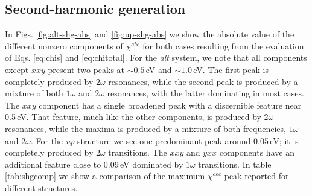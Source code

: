 \documentclass[pss]{wiley2sp} %
\begin{document}
\subsection{Second-harmonic generation}
In Figs. \ref{fig:alt-shg-abs} and \ref{fig:up-shg-abs} we show the absolute value of the different nonzero components of $\chi^{abc}$ for both cases resulting from the evaluation of Eqs. \eqref{eq:chis} and \eqref{eq:chitotal}. For the \emph{alt} system, we note that all components except $xxy$ present two peaks at $\sim0.5$\,eV and $\sim1.0$\,eV. The first peak is completely produced by $2\omega$ resonances, while the second peak is produced by a mixture of both $1\omega$ and $2\omega$ resonances, with the latter dominating in most cases. The $xxy$ component has a single broadened peak with a discernible feature near 0.5\,eV. That feature, much like the other components, is produced by $2\omega$ resonances, while the maxima is produced by a mixture of both frequencies, $1\omega$ and $2\omega$. For the \emph{up} structure we see one predominant peak around 0.05\,eV; it is completely produced by $2\omega$ transitions. The $xxy$ and $yxx$ components have an additional feature close to 0.09\,eV dominated by $1\omega$ transitions. In table \ref{tab:shgcomp} we show a comparison of the maximum $\chi^{abc}$ peak reported for different structures.
% 
% 
% 
\end{document}
